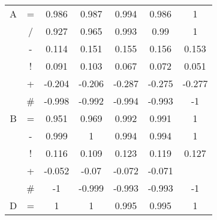 \documentclass{sfuthesis}
\begin{document}
\begin{table}[]
\begin{tabular}{ccccccc}
		A              & \multicolumn{1}{c|}{=}                & 0.986              & 0.987                 & 0.994                & \multicolumn{1}{c|}{0.986}               & 1             \\
		& \multicolumn{1}{c|}{/}                & 0.927              & 0.965                 & 0.993                & \multicolumn{1}{c|}{0.99}                & 1             \\
		& \multicolumn{1}{c|}{-}                & 0.114              & 0.151                 & 0.155                & \multicolumn{1}{c|}{0.156}               & 0.153         \\
		& \multicolumn{1}{c|}{!}                & 0.091              & 0.103                 & 0.067                & \multicolumn{1}{c|}{0.072}               & 0.051         \\
		& \multicolumn{1}{c|}{+}                & -0.204             & -0.206                & -0.287               & \multicolumn{1}{c|}{-0.275}              & -0.277        \\
		& \multicolumn{1}{c|}{\#}               & -0.998             & -0.992                & -0.994               & \multicolumn{1}{c|}{-0.993}              & -1            \\ \hline
		B              & \multicolumn{1}{c|}{=}                & 0.951              & 0.969                 & 0.992                & \multicolumn{1}{c|}{0.991}               & 1             \\
		& \multicolumn{1}{c|}{-}                & 0.999              & 1                     & 0.994                & \multicolumn{1}{c|}{0.994}               & 1             \\
		& \multicolumn{1}{c|}{!}                & 0.116              & 0.109                 & 0.123                & \multicolumn{1}{c|}{0.119}               & 0.127         \\
		& \multicolumn{1}{c|}{+}                & -0.052             & -0.07                 & -0.072               & \multicolumn{1}{c|}{-0.071}              &               \\
		& \multicolumn{1}{c|}{\#}               & -1                 & -0.999                & -0.993               & \multicolumn{1}{c|}{-0.993}              & -1            \\ \hline
		D              & \multicolumn{1}{c|}{=}                & 1                  & 1                     & 0.995                & \multicolumn{1}{c|}{0.995}               & 1             \\

\end{tabular}
\end{table}
\end{document}
